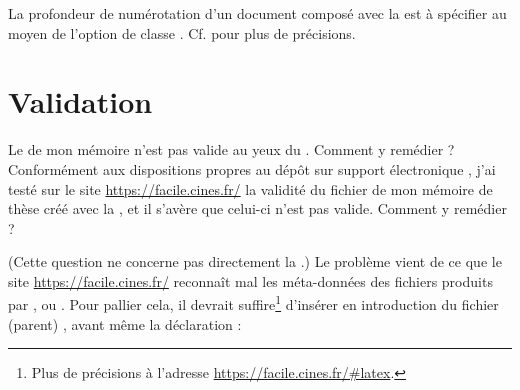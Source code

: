 La profondeur de numérotation d'un document composé avec la \yatCl{} est
à spécifier au moyen de l'option de classe
. Cf.  pour plus de précisions.

\section{Validation}
\label{sec-validation}

\begin{dbfaq}{Le  de mon mémoire n'est pas valide au yeux du
    . Comment y remédier ?}{}
   
  Conformément aux dispositions propres au dépôt sur support électronique
  \autocite{guidoct-abes}, j'ai testé sur le site \url{https://facile.cines.fr/}
  la validité du fichier  de mon mémoire de thèse créé avec la
  \yatCl{}, et il s'avère que celui-ci n'est pas valide. Comment y remédier ?
\end{dbfaq}

(Cette question ne concerne pas directement la \yatCl{}.) Le problème
vient de ce que le site \url{https://facile.cines.fr/} reconnaît mal les
méta-données des fichiers  produits par ,
 ou .
Pour pallier cela, il devrait suffire\footnote{Plus de précisions à l'adresse
  \url{https://facile.cines.fr/\#latex}.} d'insérer en introduction du fichier
(parent) , avant même la déclaration  :
\begin{preamblecode}
\end{preamblecode}

